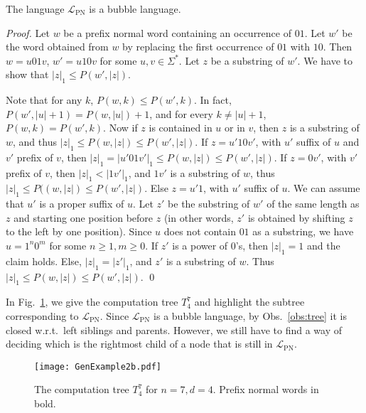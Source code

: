 \documentclass[11pt,a4paper]{llncs}
\newcommand{\LPN}{{\mathcal L}_{\textrm{PN}}}
\begin{document}
\begin{lemma}
\label{lemma:PNbubble}
 The language $\LPN$ is a bubble language.
\end{lemma}

\begin{proof}
Let $w$ be a prefix normal word containing an occurrence of $01$. Let $w'$ be the word obtained from $w$ by replacing the first occurrence of $01$ with $10$. Then $w=u01v$, $w'=u10v$ for some $u,v\in \Sigma^{*}$. Let $z$ be a substring of $w'$. We have to show that $|z|_{1}\le P(w',|z|)$.
 
Note that for any $k$, $P(w,k)\le P(w',k)$. In fact, $P(w',|u|+1) = P(w,|u|)+1$, and for every $k\neq |u|+1$, $P(w,k) = P(w',k)$. Now if $z$ is contained in $u$ or in $v$, then $z$ is a substring of $w$, and thus $|z|_1\le P(w,|z|) \le P(w',|z|)$. If $z=u'10v'$, with $u'$ suffix of $u$ and $v'$ prefix of $v$, then  $|z|_{1}=|u'01v'|_{1}\le P(w,|z|) \le P(w',|z|)$. If $z=0v'$, with $v'$ prefix of $v$, then $|z|_{1}<|1v'|_{1}$, and $1v'$ is a substring of $w$, thus $|z|_{1}\le P((w,|z|)\le P(w',|z|)$. 
Else $z=u'1$, with $u'$ suffix of $u$. We can assume that $u'$ is a proper suffix of $u$. Let $z'$ be the substring of $w'$ of the same length as $z$ and starting one position before $z$ (in other words, $z'$ is obtained by shifting $z$ to the left by one position). Since $u$ does not contain $01$ as a substring, we have $u=1^{n}0^{m}$ for some $n\ge 1, m\ge 0$. If $z'$ is a power of $0$'s, then $|z|_{1}=1$ and the claim holds. Else, $|z|_{1}=|z'|_{1}$, and $z'$ is a substring of $w$. Thus $|z|_{1}\le P(w,|z|) \le P(w',|z|)$. \hfill \qed
\end{proof}



In Fig.~\ref{fig:example2}, we give the computation tree $T_4^7$ and highlight the subtree corresponding to $\LPN$.  Since $\LPN$ is a bubble language, by Obs.~\ref{obs:tree} it is closed w.r.t.\ left siblings and parents. However, we still have to find a way of deciding which is the rightmost child of a node that is still in $\LPN$.

\begin{figure}
\begin{center}
\texttt{[image: GenExample2b.pdf]}
\caption{\label{fig:example2}The computation tree $T_4^7$ for $n=7,d=4$. Prefix normal words in bold.}
\end{center}
\end{figure}
\end{document}
